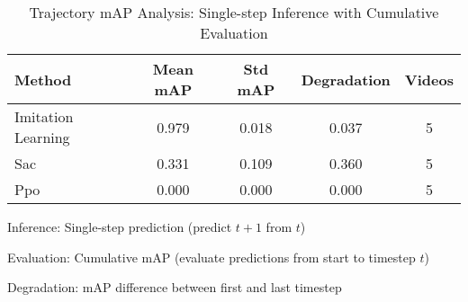 
\begin{table}[htb]
\centering
\caption{Trajectory mAP Analysis: Single-step Inference with Cumulative Evaluation}
\label{tab:trajectory_map_results}
\begin{tabular}{lcccc}
\toprule
Method & Mean mAP & Std mAP & Degradation & Videos \\
\midrule
Imitation Learning & 0.979 & 0.018 & 0.037 & 5 \\
Sac & 0.331 & 0.109 & 0.360 & 5 \\
Ppo & 0.000 & 0.000 & 0.000 & 5 \\

\bottomrule
\end{tabular}
\begin{tablenotes}
\small
\item Inference: Single-step prediction (predict $t+1$ from $t$)
\item Evaluation: Cumulative mAP (evaluate predictions from start to timestep $t$)
\item Degradation: mAP difference between first and last timestep
\end{tablenotes}
\end{table}
